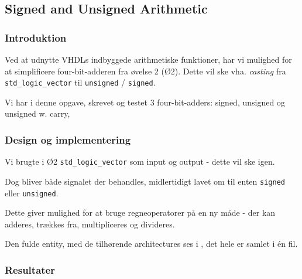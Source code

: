 \subsection{Signed and Unsigned Arithmetic}

\subsubsection{Introduktion}

Ved at udnytte VHDLs indbyggede arithmetiske funktioner, har vi mulighed for at simplificere four-bit-adderen fra øvelse 2 (Ø2).
Dette vil ske vha.  \textit{casting} fra \texttt{std\_logic\_vector} til \texttt{unsigned} / \texttt{signed}. 

Vi har i denne opgave, skrevet og testet 3 four-bit-adders: signed, unsigned og unsigned w. carry, 

\subsubsection{Design og implementering}

Vi brugte i Ø2 \texttt{std\_logic\_vector} som input og output - dette vil ske igen. 

Dog bliver både signalet der behandles, midlertidigt lavet om til enten \texttt{signed} eller \texttt{unsigned}.

Dette giver mulighed for at bruge regneoperatorer på en ny måde - der kan adderes, trækkes fra, multipliceres og divideres.

Den fulde entity, med de tilhørende architectures ses i , det hele er samlet i én fil.




\subsubsection{Resultater}



